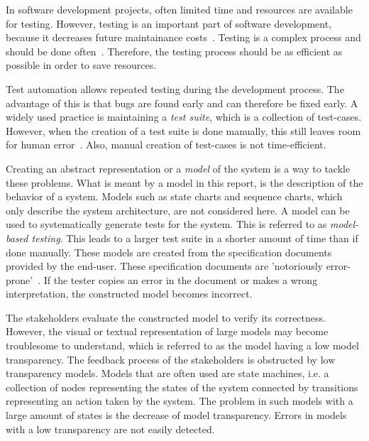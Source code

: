 In software development projects, often limited time and resources are available for testing. However, testing is an important part of software development, because it decreases future maintainance costs~\cite{McConnell:testing}. Testing is a complex process and should be done often~\cite{Pol:testing}. Therefore, the testing process should be as efficient as possible in order to save resources.

Test automation allows repeated testing during the development process. The advantage of this is that bugs are found early and can therefore be fixed early.  A widely used practice is maintaining a \textit{test suite}, which is a collection of test-cases. However, when the creation of a test suite is done manually, this still leaves room for human error~\cite{Blackburn:testing}. Also, manual creation of test-cases is not time-efficient.

Creating an abstract representation or a \textit{model} of the system is a way to tackle these problems. What is meant by a model in this report, is the description of the behavior of a system. Models such as state charts and sequence charts, which only describe the system architecture, are not considered here. A model can be used to systematically generate tests for the system. This is referred to as \textit{model-based testing}. This leads to a larger test suite in a shorter amount of time than if done manually. These models are created from the specification documents provided by the end-user. These specification documents are 'notoriously error-prone'~\cite{McCabe:testing}. If the tester copies an error in the document or makes a wrong interpretation, the constructed model becomes incorrect.

The stakeholders evaluate the constructed model to verify its correctness. However, the visual or textual representation of large models may become troublesome to understand, which is referred to as the model having a low model transparency. The feedback process of the stakeholders is obstructed by low transparency models. Models that are often used are state machines, i.e. a collection of nodes representing the states of the system connected by transitions representing an action taken by the system. The problem in such models with a large amount of states is the decrease of model transparency. Errors in models with a low transparency are not easily detected.

